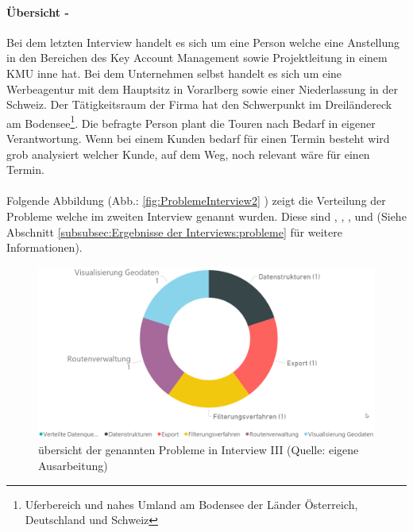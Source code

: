 \documentclass[Bachelorarbeit.tex]{subfiles}
\begin{document}
\paragraph*{Übersicht - }
Bei dem letzten Interview handelt es sich um eine Person welche eine Anstellung in den Bereichen des Key Account Management sowie Projektleitung in einem \ac{KMU} inne hat.
Bei dem Unternehmen selbst handelt es sich um eine Werbeagentur mit dem Hauptsitz in Vorarlberg sowie einer Niederlassung in der Schweiz.
Der Tätigkeitsraum der Firma hat den Schwerpunkt im Dreiländereck am Bodensee\footnote{Uferbereich und nahes Umland am Bodensee der Länder Österreich, Deutschland und Schweiz}. 
Die befragte Person plant die Touren nach Bedarf in eigener Verantwortung.
Wenn bei einem Kunden bedarf für einen Termin besteht wird grob analysiert welcher Kunde, auf dem Weg, noch relevant wäre für einen Termin.\\
\\
Folgende Abbildung (Abb.: \ref{fig:ProblemeInterview2} ) zeigt die Verteilung der Probleme welche im zweiten Interview genannt wurden. 
Diese sind , , ,  und  (Siehe Abschnitt \ref{subsubsec:Ergebnisse der Interviews:probleme}  für weitere Informationen).

\begin{figure}[h]
\centering
\includegraphics[width=1\linewidth]{img/Interviews/ProblemeInterview3}
\caption[Probleme in Interview III]{übersicht der genannten Probleme in Interview III (Quelle: eigene Ausarbeitung)}
\label{fig:ProblemeInterview3}
\end{figure}
\end{document}
